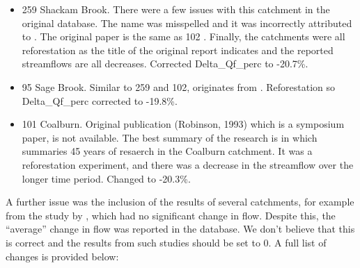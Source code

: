 \documentclass[]{elsarticle} %
\begin{document}
\begin{itemize}
\item
  259 Shackam Brook. There were a few issues with this catchment in the original database. The name was misspelled and it was incorrectly attributed to \citet{brown2005}. The original paper is the same as 102 \citep{schneider1961}. Finally, the catchments were all reforestation as the title of the original report indicates and the reported streamflows are all decreases. Corrected Delta\_Qf\_perc to -20.7\%.\\
\item
  95 Sage Brook. Similar to 259 and 102, originates from \citet{schneider1961}. Reforestation so Delta\_Qf\_perc corrected to -19.8\%.\\
\item
  101 Coalburn. Original publication (Robinson, 1993) which is a symposium paper, is not available. The best summary of the research is in \citet{birkinshaw2014} which summaries 45 years of resaerch in the Coalburn catchment. It was a reforestation experiment, and there was a decrease in the streamflow over the longer time period. Changed to -20.3\%.
\end{itemize}

A further issue was the inclusion of the results of several catchments, for example from the study by \citet{beck2013}, which had no significant change in flow. Despite this, the ``average'' change in flow was reported in the database. We don't believe that this is correct and the results from such studies should be set to 0. A full list of changes is provided below:
\end{document}
